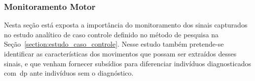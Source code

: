 % 
% 
% 



\subsubsection{Monitoramento Motor}
Nesta seção está exposta a importância do monitoramento dos sinais capturados no estudo analítico de caso controle definido no método de pesquisa na Seção~\ref{section:estudo_caso_controle}. Nesse estudo também pretende-se identificar as características dos movimentos que possam ser extraídos desses sinais, e que venham fornecer subsídios para diferenciar indivíduos diagnosticados com~\ac{dp} ante indivíduos sem o diagnóstico.

